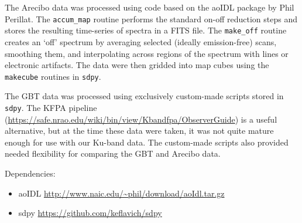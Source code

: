 The Arecibo data was processed using code based on the aoIDL package by Phil
Perillat.  The \texttt{accum\_map} routine performs the standard on-off reduction
steps and stores the resulting time-series of spectra in a FITS file.  The
\texttt{make\_off} routine creates an `off' spectrum by averaging selected
(ideally emission-free) scans, smoothing them, and interpolating across
regions of the spectrum with lines or electronic artifacts.  The data were then
gridded into map cubes using the \texttt{makecube} routines in \texttt{sdpy}.

The GBT data was processed using exclusively custom-made scripts stored in
\texttt{sdpy}.  The KFPA pipeline
(\url{https://safe.nrao.edu/wiki/bin/view/Kbandfpa/ObserverGuide}) is a useful
alternative, but at the time these data were taken, it was not quite mature
enough for use with our Ku-band data.  The custom-made scripts also provided
needed flexibility for comparing the GBT and Arecibo data.


Dependencies:
\begin{itemize}
    \item aoIDL \url{http://www.naic.edu/~phil/download/aoIdl.tar.gz}
    \item sdpy \url{https://github.com/keflavich/sdpy}
\end{itemize}





